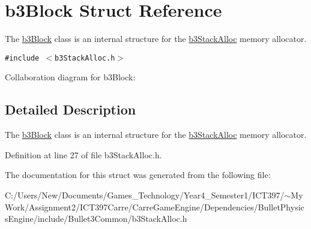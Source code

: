 \hypertarget{structb3_block}{
\section{b3Block Struct Reference}
\label{structb3_block}
}
The \hyperlink{structb3_block}{b3Block} class is an internal structure for the \hyperlink{classb3_stack_alloc}{b3StackAlloc} memory allocator.  


{\tt \#include $<$b3StackAlloc.h$>$}

Collaboration diagram for b3Block:

\subsection{Detailed Description}
The \hyperlink{structb3_block}{b3Block} class is an internal structure for the \hyperlink{classb3_stack_alloc}{b3StackAlloc} memory allocator. 

Definition at line 27 of file b3StackAlloc.h.

The documentation for this struct was generated from the following file:\begin{CompactItemize}
\item 
C:/Users/New/Documents/Games\_\-Technology/Year4\_\-Semester1/ICT397/$\sim$My Work/Assignment2/ICT397Carre/CarreGameEngine/Dependencies/BulletPhysicsEngine/include/Bullet3Common/b3StackAlloc.h\end{CompactItemize}

